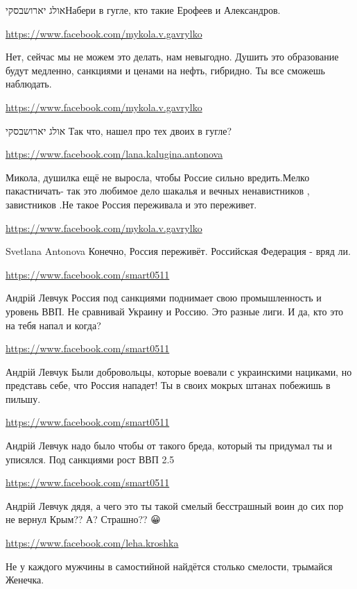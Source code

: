 \documentclass[a4paper,11pt]{extreport}
\begin{document}
\begin{itemize}
\begin{itemize}
אולג יארושבסקיНабери в гугле, кто такие Ерофеев и Александров.

\url{https://www.facebook.com/mykola.v.gavrylko}

Нет, сейчас мы не можем это делать, нам невыгодно. Душить это образование будут медленно, санкциями и ценами на нефть, гибридно. Ты все сможешь наблюдать.

\url{https://www.facebook.com/mykola.v.gavrylko}

אולג יארושבסקי Так что, нашел про тех двоих в гугле?

\url{https://www.facebook.com/lana.kalugina.antonova}

Микола, душилка ещё не выросла, чтобы Россие сильно вредить.Мелко пакастничать- так это любимое дело шакалья и вечных ненавистников , завистников .Не такое Россия переживала и это переживет.

\url{https://www.facebook.com/mykola.v.gavrylko}

Svetlana Antonova Конечно, Россия переживёт. Российская Федерация - вряд ли.

\url{https://www.facebook.com/smart0511}

Андрій Левчук Россия под санкциями поднимает свою промышленность и уровень ВВП. Не сравнивай Украину и Россию. Это разные лиги. И да, кто это на тебя напал и когда?

\url{https://www.facebook.com/smart0511}

Андрій Левчук Были добровольцы, которые воевали с украинскими нациками, но представь себе, что Россия нападет! Ты в своих мокрых штанах побежишь в пильшу.

\url{https://www.facebook.com/smart0511}

Андрій Левчук надо было чтобы от такого бреда, который ты придумал ты и уписялся. Под санкциями рост ВВП 2.5%

\url{https://www.facebook.com/smart0511}

Андрій Левчук дядя, а чего это ты такой смелый бесстрашный воин до сих пор не вернул Крым?? А? Страшно?? 😀

\end{itemize}
\url{https://www.facebook.com/leha.kroshka}

Не у каждого мужчины в самостийной найдётся столько смелости, трымайся Женечка.


\end{itemize}
\end{document}
